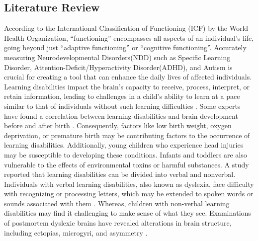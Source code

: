 \documentclass{article}
\begin{document}
\begin{multicols}{2}
\section{Literature Review}
\hspace*{\parindent}According to the International Classification of Functioning (ICF) by the World Health Organization, ``functioning'' encompasses all aspects of an individual’s life, going beyond just ``adaptive functioning'' or ``cognitive functioning''. Accurately measuring Neurodevelopmental Disorders(NDD) such as Specific Learning Disorder, Attention-Deficit/Hyperactivity Disorder(ADHD), and Autism is crucial for creating a tool that can enhance the daily lives of affected individuals. Learning disabilities impact the brain's capacity to receive, process, interpret, or retain information, leading to challenges in a child's ability to learn at a pace similar to that of individuals without such learning difficulties \cite{sood2013construction}. Some experts have found a correlation between learning disabilities and brain development before and after birth \cite{cruickshank1975perceptual}. Consequently, factors like low birth weight, oxygen deprivation, or premature birth may be contributing factors to the occurrence of learning disabilities. Additionally, young children who experience head injuries may be susceptible to developing these conditions. Infants and toddlers are also vulnerable to the effects of environmental toxins or harmful substances. A study reported that learning disabilities can be divided into verbal and nonverbal. Individuals with verbal learning disabilities, also known as dyslexia, face difficulty with recognizing or processing letters, which may be extended to spoken words or sounds associated with them \cite{lerner1997learning}. Whereas, children with non-verbal learning disabilities may find it challenging to make sense of what they see. Examinations of postmortem dyslexic brains have revealed alterations in brain structure, including ectopias, microgyri, and asymmetry \cite{caylak2009neurobiological}.\\\\

\end{multicols}
\end{document}
